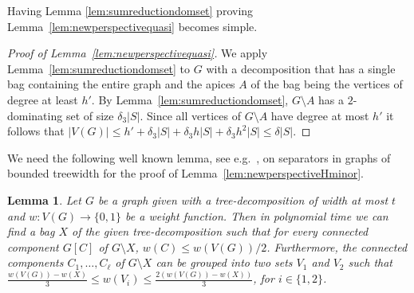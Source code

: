 \documentclass[11pt]{article}
\newtheorem{lemma}{Lemma}
\begin{document}
Having Lemma \ref{lem:sumreductiondomset} proving Lemma~\ref{lem:newperspectivequasi} becomes simple.

\begin{proof}[Proof of Lemma~\ref{lem:newperspectivequasi}]
We apply Lemma~\ref{lem:sumreductiondomset} to $G$ with a decomposition that has a single bag containing the entire graph and the apices $A$ of the bag being the vertices of degree at least $h'$. By Lemma~\ref{lem:sumreductiondomset}, $G \setminus A$ has a $2$-dominating set of size $\delta_3|S|$. Since all vertices of $G \setminus A$ have degree at most $h'$ it follows that $|V(G)| \leq h' +  \delta_3 |S| + \delta_3h|S|+ \delta_3h^2|S| \leq \delta|S|$. 
\end{proof}

We need the following well known lemma, see e.g.\ \cite{Bodlaender98}, on separators in graphs of bounded treewidth for the proof of Lemma~\ref{lem:newperspectiveHminor}. 
\begin{lemma}
\label{lemma:balsep1}
Let $G$ be a graph given with a tree-decomposition of width at most $t$ and 
$w:V(G)\rightarrow \{0 ,1\}$ 
be a weight function. 
Then  in polynomial time we can find a bag $X$ of the given tree-decomposition 
such that for every connected component $G[C]$ of $G\setminus X$, $w(C)\leq w(V(G))/2$. Furthermore, 
the connected components $C_1,\ldots,C_\ell$ of $G \setminus X$ can be grouped into two sets 
$V_1$ and $V_2$ such that 
$\frac{w(V(G))-w(X)}{3}\leq w(V_i)\leq \frac{2(w(V(G))-w(X))}{3}$, for $i\in \{1,2\}$. \end{lemma}
\end{document}
